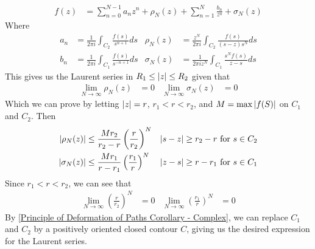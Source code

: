 \documentclass[12pt, english]{book}
\makeatletter
\renewenvironment{proof}[1][\proofname]{\par
	\pushQED{\qed}%
	\normalfont \topsep6\p@\@plus6\p@\relax
	\list{}{%
		\settowidth{\leftmargin}{\itshape\proofname:\hskip\labelsep}%
		\setlength{\labelwidth}{0pt}%
		\setlength{\itemindent}{-\leftmargin}%
	}%
	\item[\hskip\labelsep\itshape#1\@addpunct{:}]\ignorespaces
	}{ \popQED\endlist\@endpefalse}
\makeatother
\begin{document}
\begin{proof}
\begin{align*}
 			f(z) &= \sum_{n=0}^{N-1} a_n z^n + \rho_N (z) + \sum_{n=1}^{N} \frac{b_n}{z^n} + \sigma_N (z) 
 		\end{align*}
 		Where
 		\begin{align*}
 			a_n &= \frac{1}{2\pi i} \int_{C_2} \frac{f(s)}{s^{n+1}} ds &
 				\rho_N (z) &= \frac{z^N}{2\pi i} \int_{C_2} \frac{f(s)}{(s-z)s^N} ds \\
 			b_n &= \frac{1}{2\pi i} \int_{C_1} \frac{f(s)}{s^{-n+1}} ds &
 				\sigma_N (z) &= \frac{1}{2\pi i z^N} \int_{C_1} \frac{s^N f(s)}{z-s} ds
 		\end{align*}
 		This gives us the Laurent series in \(R_1 \leq \abs{z} \leq R_2\) given that 
 		\begin{align*}
 			\lim_{N\rightarrow \infty} \rho_N(z) &= 0 & 
 			\lim_{N\rightarrow \infty} \sigma_N (z) &= 0
 		\end{align*}
 		Which we can prove by letting \(\abs{z} = r\), \(r_1 < r < r_2\), and \(M = \max\abs{f(S)}\) on \(C_1\) and \(C_2\). Then
 		\begin{align*}
 			\abs{\rho_N (z)} &\leq \frac{M r_2}{r_2 - r} \left(\frac{r}{r_2}\right)^N & 
 				\abs{s-z} &\geq r_2 - r  \text{ for } s \in C_2\\
 			\abs{\sigma_N (z)} &\leq \frac{M r_1}{r-r_1} \left(\frac{r_1}{r}\right)^N &
 				\abs{z-s} &\geq r - r_1  \text{ for } s \in C_1
 		\end{align*}
 		Since \(r_1 < r < r_2\), we can see that 
 		\begin{align*}
 			\lim_{N \rightarrow \infty} \left(\frac{r}{r_2}\right)^N &= 0 & 
 			\lim_{N \rightarrow \infty} \left(\frac{r_1}{r}\right)^N &= 0
 		\end{align*}
		By \cref{Principle of Deformation of Paths Corollary - Complex}, we can replace \(C_1\) and \(C_2\) by a positively oriented closed contour \(C\), giving us the desired expression for the Laurent series.
		

\end{proof}
\end{document}
